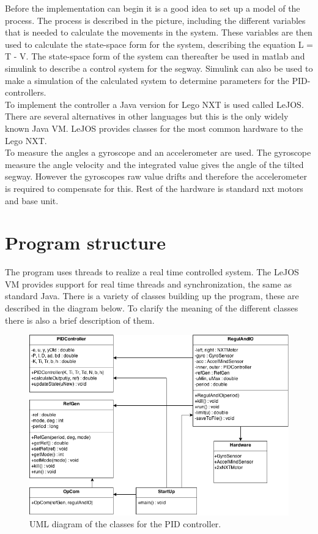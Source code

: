 \documentclass[a4paper]{article}
\begin{document}
Before the implementation can begin it is a good idea to set up a model of the process. The process is described in the picture, including the different variables that is needed to calculate the movements in the system. These variables are then used to calculate the state-space form for the system, describing the equation L = T - V. The state-space form of the system can thereafter be used in matlab and simulink to describe a control system for the segway. Simulink can also be used to make a simulation of the calculated system to determine parameters for the PID-controllers. \\

To implement the controller a Java version for Lego NXT is used called LeJOS. There are several alternatives in other languages but this is the only widely known Java VM. LeJOS provides classes for the most common hardware to the Lego NXT\cite{lejos}.  \\

To measure the angles a gyroscope and an accelerometer are used. The gyroscope measure the angle velocity and the integrated value gives the angle of the tilted segway. However the gyroscopes raw value drifts and therefore the accelerometer is required to compensate for this. Rest of the hardware is standard nxt motors and base unit.

\section{Program structure}
The program uses threads to realize a real time controlled system. The LeJOS VM provides support for real time threads and synchronization, the same as standard Java. There is a variety of classes building up the program, these are described in the diagram below. To clarify the meaning of the different classes there is also a brief description of them.

\begin{figure}[H]
 \centering
\includegraphics[scale=0.5]{pic/UML_LEGO_SEGWAY_ALLCAPS.png}
\caption{UML diagram of the classes for the PID controller.}
\end{figure}
\end{document}
